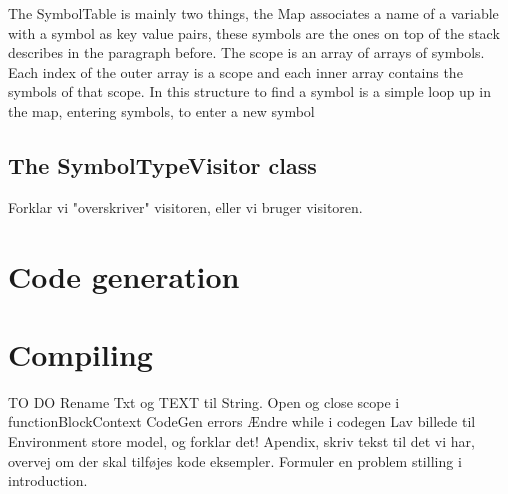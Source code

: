 The SymbolTable is mainly two things, the Map associates a name of a variable with a symbol as key value pairs, these symbols are the ones on top of the stack describes in the paragraph before. The scope is an array of arrays of symbols. Each index of the outer array is a scope and each inner array contains the symbols of that scope. In this structure to find a symbol is a simple loop up in the map, entering symbols, to enter a new symbol 

\subsection{The SymbolTypeVisitor class}


Forklar vi "overskriver" visitoren, eller vi bruger visitoren.
\section{Code generation}


\section{Compiling}


TO DO
Rename Txt og TEXT til String.
Open og close scope i functionBlockContext
CodeGen errors
Ændre while i codegen
Lav billede til Environment store model, og forklar det!
Apendix, skriv tekst til det vi har, overvej om der skal tilføjes kode eksempler.
Formuler en problem stilling i introduction.


